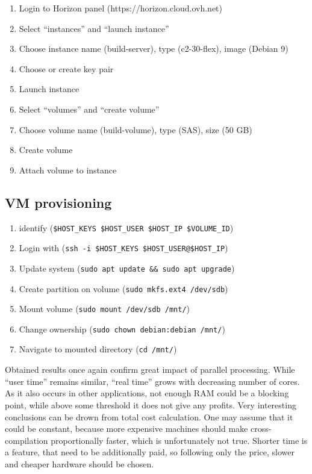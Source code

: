 \documentclass[printmode]{mgr}
\begin{document}
\begin{enumerate}
  \itemsep0em
  \item Login to Horizon panel (https://horizon.cloud.ovh.net)
  \item Select ``instances'' and ``launch instance''
  \item Choose instance name (build-server), type (c2-30-flex), image (Debian 9)
  \item Choose or create key pair
  \item Launch instance
  \item Select ``volumes'' and ``create volume'' %
  \item Choose volume name (build-volume), type (SAS), size (50 GB)
  \item Create volume
  \item Attach volume to instance
\end{enumerate}

\subsection*{VM provisioning}

\begin{enumerate}
  \itemsep0em
  \item identify (\verb|$HOST_KEYS $HOST_USER $HOST_IP $VOLUME_ID|)
  \item Login with (\verb|ssh -i $HOST_KEYS $HOST_USER@$HOST_IP|)
  \item Update system (\verb|sudo apt update && sudo apt upgrade|)
  \item Create partition on volume (\verb|sudo mkfs.ext4 /dev/sdb|)
  \item Mount volume (\verb|sudo mount /dev/sdb /mnt/|)
  \item Change ownership (\verb|sudo chown debian:debian /mnt/|)
  \item Navigate to mounted directory (\verb|cd /mnt/|)
\end{enumerate}

Obtained results once again confirm great impact of parallel processing.
While ``user time'' remains similar, ``real time'' grows with decreasing number of cores.
As it also occurs in other applications, not enough RAM could be a blocking point, while above some threshold it does not give any profits.
Very interesting conclusions can be drown from total cost calculation.
One may assume that it could be constant, because more expensive machines should make cross-compilation proportionally faster, which is unfortunately not true.
Shorter time is a feature, that need to be additionally paid, so following only the price, slower and cheaper hardware should be chosen.
\end{document}
